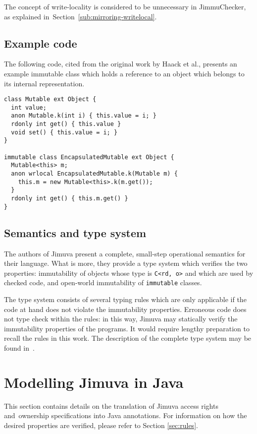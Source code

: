 \documentclass{pracamgr}
\theoremstyle{break}
\theoremstyle{break}
\theoremstyle{break}
\begin{document}
The concept of write-locality is considered to be unnecessary in
JimmuChecker, as explained in~Section~\ref{sub:mirroring-writelocal}.

\subsection{Example code}

The following code, cited from the original work by Haack et al.,
presents an example immutable class which holds a reference to an
object which belongs to its internal representation.

\begin{lstlisting}
class Mutable ext Object {
  int value; 
  anon Mutable.k(int i) { this.value = i; }
  rdonly int get() { this.value }
  void set() { this.value = i; }
}

immutable class EncapsulatedMutable ext Object {
  Mutable<this> m; 
  anon wrlocal EncapsulatedMutable.k(Mutable m) {
    this.m = new Mutable<this>.k(m.get()); 
  }
  rdonly int get() { this.m.get() }
}
\end{lstlisting}

\subsection{Semantics and type system}

The authors of Jimuva present a complete, small-step operational
semantics for their language. What is more, they provide a type system
which verifies the two properties: immutability of objects whose type
is \texttt{C<rd, o>} and which are used by checked code, and
open-world immutability of \texttt{immutable} classes. 

The type system consists of several typing rules which are only
applicable if the code at hand does not violate the immutability
properties. Erroneous code does not type check within the rules: in
this way, Jimuva may statically verify the immutability properties of
the programs. It would require lengthy preparation to recall the rules
in this work. The description of the complete type system may be found
in~\cite{haack}.

\section{Modelling Jimuva in Java}
\label{sec:modelling}

This section contains details on the translation of Jimuva access
rights and~ownership spe\-ci\-fi\-ca\-tions into Java annotations. For
information on how the desired properties are verified, please refer
to Section \ref{sec:rules}.
\end{document}
